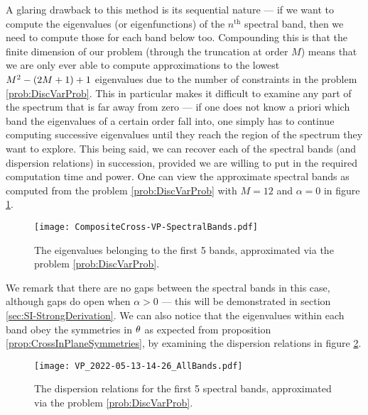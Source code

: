 A glaring drawback to this method is its sequential nature --- if we want to compute the eigenvalues (or eigenfunctions) of the $n^{\text{th}}$ spectral band, then we need to compute those for each band below too.
Compounding this is that the finite dimension of our problem (through the truncation at order $M$) means that we are only ever able to compute approximations to the lowest $M^2 - \left( 2M + 1 \right) + 1$ eigenvalues due to the number of constraints in the problem \ref{prob:DiscVarProb}.
This in particular makes it difficult to examine any part of the spectrum that is far away from zero --- if one does not know a priori which band the eigenvalues of a certain order fall into, one simply has to continue computing successive eigenvalues until they reach the region of the spectrum they want to explore.
This being said, we can recover each of the spectral bands (and dispersion relations) in succession, provided we are willing to put in the required computation time and power.
One can view the approximate spectral bands as computed from the problem \ref{prob:DiscVarProb} with $M=12$ and $\alpha=0$ in figure \ref{fig:CompositeCross-VP-SpectralBands}.
\begin{figure}[t!]
	\centering
	\texttt{[image: CompositeCross-VP-SpectralBands.pdf]}
	\caption[optional text]{\label{fig:CompositeCross-VP-SpectralBands} The eigenvalues belonging to the first 5 bands, approximated via the problem \ref{prob:DiscVarProb}.}
\end{figure}
We remark that there are no gaps between the spectral bands in this case, although gaps do open when $\alpha>0$ --- this will be demonstrated in section \ref{sec:SI-StrongDerivation}.
We can also notice that the eigenvalues within each band obey the symmetries in $\theta$ as expected from proposition \ref{prop:CrossInPlaneSymmetries}, by examining the dispersion relations in figure \ref{fig:VP_AllBands}.
\begin{figure}[t!]
	\centering
	\texttt{[image: VP\_2022-05-13-14-26\_AllBands.pdf]}
	\caption[optional text]{\label{fig:VP_AllBands} The dispersion relations for the first 5 spectral bands, approximated via the problem \ref{prob:DiscVarProb}.}
\end{figure}